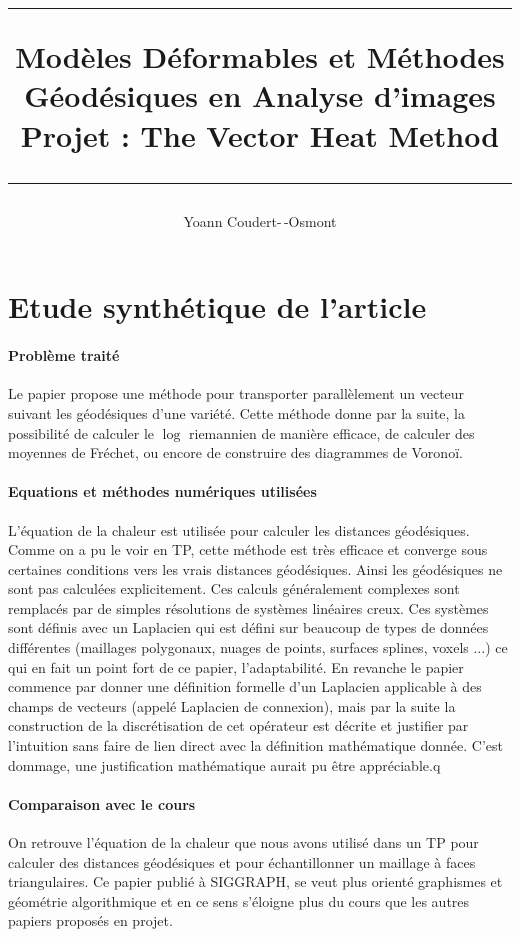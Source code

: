 \documentclass[11pt]{article}
\title{
	\noindent\rule{\linewidth}{0.4pt}
	{ \huge Modèles Déformables et Méthodes Géodésiques en Analyse d’images } \\
	Projet : The Vector Heat Method \cite{VHM}
	\noindent\rule{\linewidth}{1pt}
}
\author{Yoann Coudert-\,-Osmont}
\begin{document}
	
	\maketitle
	
	\section{Etude synthétique de l'article}
	
	\paragraph{Problème traité}
	Le papier propose une méthode pour transporter parallèlement un vecteur suivant les géodésiques d'une variété. Cette méthode donne par la suite, la possibilité de calculer le $\log$ riemannien de manière efficace, de calculer des moyennes de Fréchet, ou encore de construire des diagrammes de Voronoï.
	
	\paragraph{Equations et méthodes numériques utilisées}
	L'équation de la chaleur est utilisée pour calculer les distances géodésiques. Comme on a pu le voir en TP, cette méthode est très efficace et converge sous certaines conditions vers les vrais distances géodésiques. Ainsi les géodésiques ne sont pas calculées explicitement. Ces calculs généralement complexes sont remplacés par de simples résolutions de systèmes linéaires creux. Ces systèmes sont définis avec un Laplacien qui est défini sur beaucoup de types de données différentes (maillages polygonaux, nuages de points, surfaces splines, voxels ...) ce qui en fait un point fort de ce papier, l'adaptabilité. En revanche le papier commence par donner une définition formelle d'un Laplacien applicable à des champs de vecteurs (appelé Laplacien de connexion), mais par la suite la construction de la discrétisation de cet opérateur est décrite et justifier par l'intuition sans faire de lien direct avec la définition mathématique donnée. C'est dommage, une justification mathématique aurait pu être appréciable.q
	
	\paragraph{Comparaison avec le cours}
	On retrouve l'équation de la chaleur que nous avons utilisé dans un TP pour calculer des distances géodésiques et pour échantillonner un maillage à faces triangulaires. Ce papier publié à SIGGRAPH, se veut plus orienté graphismes et géométrie algorithmique et en ce sens s'éloigne plus du cours que les autres papiers proposés en projet.
	
\end{document}
